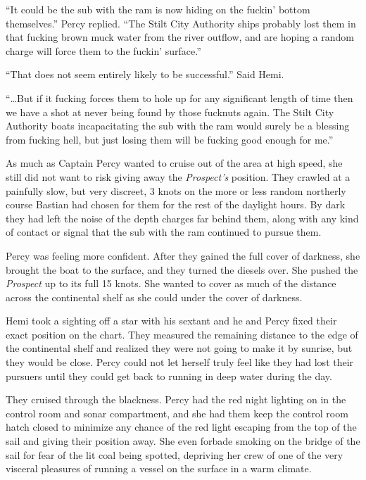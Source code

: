 \documentclass[]{scrbook}
\begin{document}
``It could be the sub with the ram is now hiding on the fuckin' bottom
themselves.'' Percy replied. ``The Stilt City Authority ships probably
lost them in that fucking brown muck water from the river outflow, and
are hoping a random charge will force them to the fuckin' surface.''

``That does not seem entirely likely to be successful.'' Said Hemi.

``\ldots{}But if it fucking forces them to hole up for any significant
length of time then we have a shot at never being found by those
fucknuts again. The Stilt City Authority boats incapacitating the sub
with the ram would surely be a blessing from fucking hell, but just
losing them will be fucking good enough for me.''

As much as Captain Percy wanted to cruise out of the area at high speed,
she still did not want to risk giving away the \emph{Prospect's}
position. They crawled at a painfully slow, but very discreet, 3 knots
on the more or less random northerly course Bastian had chosen for them
for the rest of the daylight hours. By dark they had left the noise of
the depth charges far behind them, along with any kind of contact or
signal that the sub with the ram continued to pursue them.

Percy was feeling more confident. After they gained the full cover of
darkness, she brought the boat to the surface, and they turned the
diesels over. She pushed the \emph{Prospect} up to its full 15 knots.
She wanted to cover as much of the distance across the continental shelf
as she could under the cover of darkness.

Hemi took a sighting off a star with his sextant and he and Percy fixed
their exact position on the chart. They measured the remaining distance
to the edge of the continental shelf and realized they were not going to
make it by sunrise, but they would be close. Percy could not let herself
truly feel like they had lost their pursuers until they could get back
to running in deep water during the day.

They cruised through the blackness. Percy had the red night lighting on
in the control room and sonar compartment, and she had them keep the
control room hatch closed to minimize any chance of the red light
escaping from the top of the sail and giving their position away. She
even forbade smoking on the bridge of the sail for fear of the lit coal
being spotted, depriving her crew of one of the very visceral pleasures
of running a vessel on the surface in a warm climate.
\end{document}
